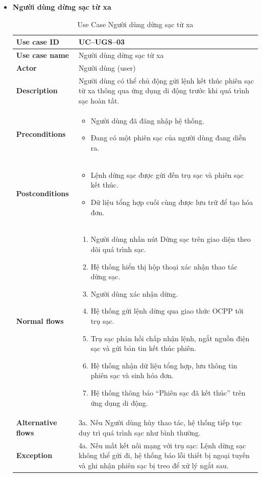 \begin{itemize}
\item \textbf{Người dùng dừng sạc từ xa}
\begin{longtable}{|m{}|m{}|}
          \caption{Use Case Người dùng dừng sạc từ xa} \\
  \hline
  \textbf{Use case ID} & UC--UGS--03 \\
  \hline
  \textbf{Use case name} & Người dùng dừng sạc từ xa \\
  \hline
  \textbf{Actor} & Người dùng (user) \\
  \hline
  \textbf{Description} & Người dùng có thể chủ động gửi lệnh kết thúc phiên sạc từ xa thông qua ứng dụng di động trước khi quá trình sạc hoàn tất. \\
  \hline
  \textbf{Preconditions} &
  \begin{itemize}
    \item Người dùng đã đăng nhập hệ thống.
    \item Đang có một phiên sạc của người dùng đang diễn ra.
  \end{itemize}\\
  \hline
  \textbf{Postconditions} &
  \begin{itemize}
    \item Lệnh dừng sạc được gửi đến trụ sạc và phiên sạc kết thúc.
    \item Dữ liệu tổng hợp cuối cùng được lưu trữ để tạo hóa đơn.
  \end{itemize}\\
  \hline
  \textbf{Normal flows} &
  \begin{enumerate}[label=\arabic*.]
    \item Người dùng nhấn nút Dừng sạc trên giao diện theo dõi quá trình sạc.
    \item Hệ thống hiển thị hộp thoại xác nhận thao tác dừng sạc.
    \item Người dùng xác nhận dừng.
    \item Hệ thống gửi lệnh dừng qua giao thức OCPP tới trụ sạc.
    \item Trụ sạc phản hồi chấp nhận lệnh, ngắt nguồn điện sạc và gửi bản tin kết thúc phiên.
    \item Hệ thống nhận dữ liệu tổng hợp, lưu thông tin phiên sạc và sinh hóa đơn.
    \item Hệ thống thông báo “Phiên sạc đã kết thúc” trên ứng dụng di động.
  \end{enumerate}\\
  \hline
  \textbf{Alternative flows} &
  3a. Nếu Người dùng hủy thao tác, hệ thống tiếp tục duy trì quá trình sạc như bình thường.\\
  \hline
  \textbf{Exception} &
  4a. Nếu mất kết nối mạng với trụ sạc: Lệnh dừng sạc không thể gửi đi, hệ thống báo lỗi thiết bị ngoại tuyến và ghi nhận phiên sạc bị treo để xử lý ngắt sau.\\
  \hline
  \end{longtable}


\end{itemize}
